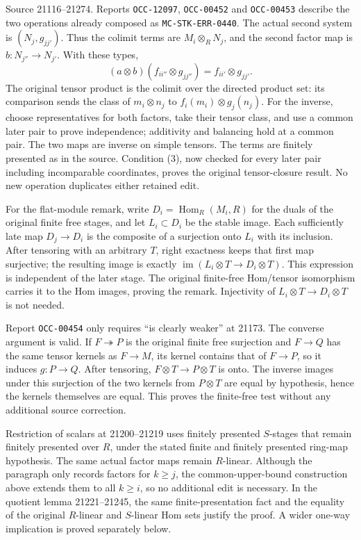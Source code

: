 Source 21116--21274. Reports \texttt{OCC-12097}, \texttt{OCC-00452} and \texttt{OCC-00453} describe the two operations already composed as \texttt{MC-STK-ERR-0440}. The actual second system is \((N_j,g_{jj'})\). Thus the colimit terms are \(M_i\otimes_R N_j\), and the second factor map is \(b:N_{j''}\to N_{j'}\). With these types, \[
(a\otimes b)(f_{ii''}\otimes g_{jj''})
=f_{ii'}\otimes g_{jj'}.
\] The original tensor product is the colimit over the directed product set: its comparison sends the class of \(m_i\otimes n_j\) to \(f_i(m_i)\otimes g_j(n_j)\). For the inverse, choose representatives for both factors, take their tensor class, and use a common later pair to prove independence; additivity and balancing hold at a common pair. The two maps are inverse on simple tensors. The terms are finitely presented as in the source. Condition (3), now checked for every later pair including incomparable coordinates, proves the original tensor-closure result. No new operation duplicates either retained edit.

For the flat-module remark, write \(D_i=\operatorname{Hom}_R(M_i,R)\) for the duals of the original finite free stages, and let \(L_i\subset D_i\) be the stable image. Each sufficiently late map \(D_j\to D_i\) is the composite of a surjection onto \(L_i\) with its inclusion. After tensoring with an arbitrary \(T\), right exactness keeps that first map surjective; the resulting image is exactly \(\operatorname{im}(L_i\otimes T\to D_i\otimes T)\). This expression is independent of the later stage. The original finite-free Hom/tensor isomorphism carries it to the Hom images, proving the remark. Injectivity of \(L_i\otimes T\to D_i\otimes T\) is not needed.

Report \texttt{OCC-00454} only requires ``is clearly weaker'' at 21173. The converse argument is valid. If \(F\twoheadrightarrow P\) is the original finite free surjection and \(F\to Q\) has the same tensor kernels as \(F\to M\), its kernel contains that of \(F\to P\), so it induces \(g:P\to Q\). After tensoring, \(F\otimes T\to P\otimes T\) is onto. The inverse images under this surjection of the two kernels from \(P\otimes T\) are equal by hypothesis, hence the kernels themselves are equal. This proves the finite-free test without any additional source correction.

Restriction of scalars at 21200--21219 uses finitely presented \(S\)-stages that remain finitely presented over \(R\), under the stated finite and finitely presented ring-map hypothesis. The same actual factor maps remain \(R\)-linear. Although the paragraph only records factors for \(k\geq j\), the common-upper-bound construction above extends them to all \(k\geq i\), so no additional edit is necessary. In the quotient lemma 21221--21245, the same finite-presentation fact and the equality of the original \(R\)-linear and \(S\)-linear Hom sets justify the proof. A wider one-way implication is proved separately below.

